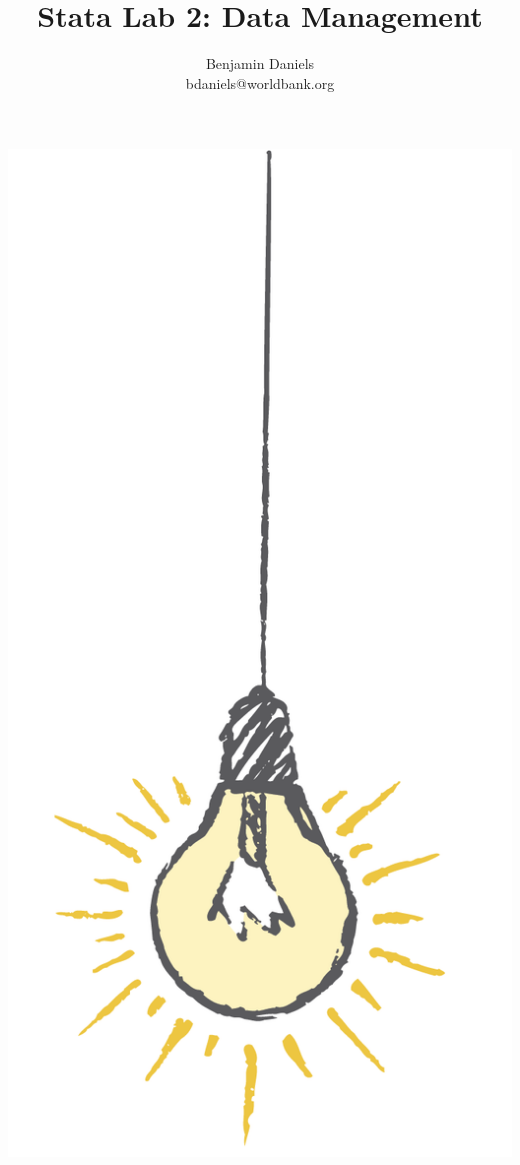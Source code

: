 \documentclass{tufte-handout}
\title{Stata Lab 2: Data Management}
\author{Benjamin Daniels \\ bdaniels@worldbank.org}
\begin{document}
\maketitle%

\begin{marginfigure}%
  \includegraphics[width=\linewidth]{light.png}
\end{marginfigure}
\end{document}
